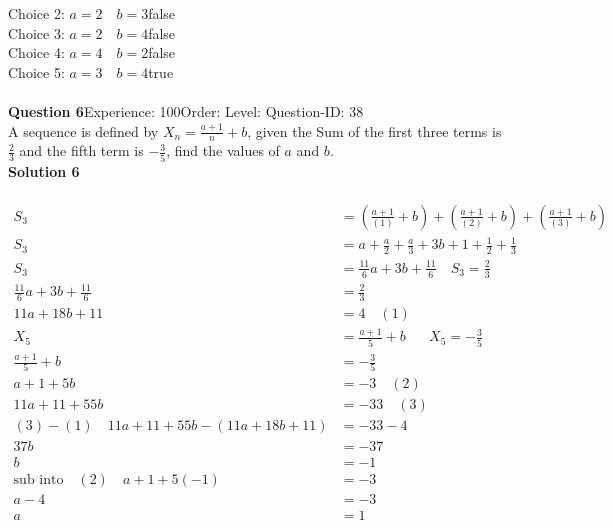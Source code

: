 \documentclass{article}
\begin{document}
Choice 2: \hspace{20pt}$a=2\quad b=3$\hspace{20pt}false\\
Choice 3: \hspace{20pt}$a=2\quad b=4$\hspace{20pt}false\\
Choice 4: \hspace{20pt}$a=4\quad b=2$\hspace{20pt}false\\
Choice 5: \hspace{20pt}$a=3\quad b=4$\hspace{20pt}true\\
\\[4pt]
\noindent\textbf{Question 6}\hspace{20pt}Experience: 100\hspace{20pt}Order: \hspace{20pt}Level: \hspace{20pt}Question-ID: 38\\[2pt]
A sequence is defined by $X_n=\displaystyle\frac{a+1}{n}+b$, given the Sum of the first three terms is $\displaystyle\frac{2}{3}$ and the fifth term is $-\displaystyle\frac{3}{5}$, find the values of $a$ and $b$.\\[4pt]
\noindent\textbf{Solution 6}\\[2pt]
\\[-35pt]\begin{align*}
S_3&=\left(\displaystyle\frac{a+1}{(1)}+b\right)+\left(\displaystyle\frac{a+1}{(2)}+b\right)+\left(\displaystyle\frac{a+1}{(3)}+b\right)\\[2pt]
S_3&=a+\displaystyle\frac{a}{2}+\displaystyle\frac{a}{3}+3b+1+\displaystyle\frac{1}{2}+\frac{1}{3}\\[2pt]
S_3&=\displaystyle\frac{11}{6}a+3b+\frac{11}{6}\quad S_3=\frac{2}{3}\\[2pt]
\displaystyle\frac{11}{6}a+3b+\frac{11}{6}&=\frac{2}{3}\\[2pt]
11a+18b+11&=4\quad(1)\\[12pt]
X_5&=\displaystyle\frac{a+1}{5}+b\hspace{20pt}X_5=-\frac{3}{5}\\[2pt]
\displaystyle\frac{a+1}{5}+b&=-\frac{3}{5}\\[2pt]
a+1+5b&=-3 \quad (2)\\[2pt]
11a+11+55b&=-33\quad (3)\\[12pt]
(3)-(1)\quad 11a+11+55b-(11a+18b+11)&=-33-4\\[2pt]
37b&=-37\\[2pt]
b&=-1\\[12pt]
\text{sub into}\quad (2) \quad a+1+5(-1)&=-3\\[2pt]
a-4&=-3\\[2pt]
a&=1
\end{align*}
\end{document}
